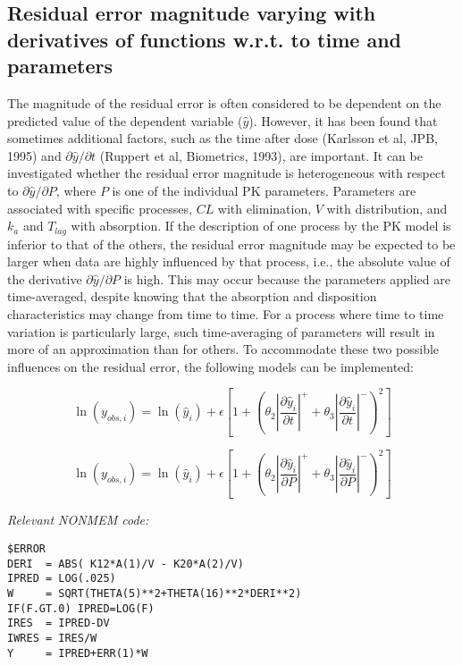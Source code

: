 \documentclass[a4paper,11pt]{article}
\begin{document}
\subsection{Residual error magnitude varying with derivatives of functions w.r.t. to time and parameters}
The magnitude of the residual error is often considered to be
dependent on the predicted value of the dependent variable
($\hat{y}$). However, it has been found that sometimes additional
factors, such as the time after dose (Karlsson et al, JPB, 1995) and
$\partial \hat{y} / \partial t$ (Ruppert et al, Biometrics, 1993), are
important. It can be investigated whether the residual error magnitude
is heterogeneous with respect to $\partial \hat{y}/\partial{P}$, where
$P$ is one of the individual PK parameters. Parameters are associated
with specific processes, $CL$ with elimination, $V$ with distribution,
and $k_a$ and $T_{lag}$ with absorption. If the description of one
process by the PK model is inferior to that of the others, the
residual error magnitude may be expected to be larger when data are
highly influenced by that process, i.e., the absolute value of the
derivative $\partial \hat{y}/\partial{P}$ is high. This may occur
because the parameters applied are time-averaged, despite knowing that
the absorption and disposition characteristics may change from time to
time. For a process where time to time variation is particularly
large, such time-averaging of parameters will result in more of an
approximation than for others. To accommodate these two possible
influences on the residual error, the following models can be
implemented:

\vspace{5pt}

\begin{equation}
\ln(y_{obs,i}) = \ln(\hat{y}_i) + \epsilon \left[1+\left(\theta_2
    \left| \frac{\partial \hat{y}_i}{\partial t} \right|^+ + \theta_3
    \left| \frac{\partial \hat{y}_i}{\partial t} \right|^- \right)^2 \right]
\end{equation}

\begin{equation}
\ln(y_{obs,i}) = \ln(\hat{y}_i) + \epsilon \left[1+\left(\theta_2
    \left| \frac{\partial \hat{y}_i}{\partial P} \right|^+ + \theta_3
    \left| \frac{\partial \hat{y}_i}{\partial P} \right|^- \right)^2 \right]
\end{equation}

\vspace{10pt}

\noindent \emph{Relevant NONMEM code:}
\begin{lstlisting}
$ERROR
DERI  = ABS( K12*A(1)/V - K20*A(2)/V)
IPRED = LOG(.025)
W     = SQRT(THETA(5)**2+THETA(16)**2*DERI**2)
IF(F.GT.0) IPRED=LOG(F)
IRES  = IPRED-DV
IWRES = IRES/W
Y     = IPRED+ERR(1)*W
\end{lstlisting}
\end{document}
